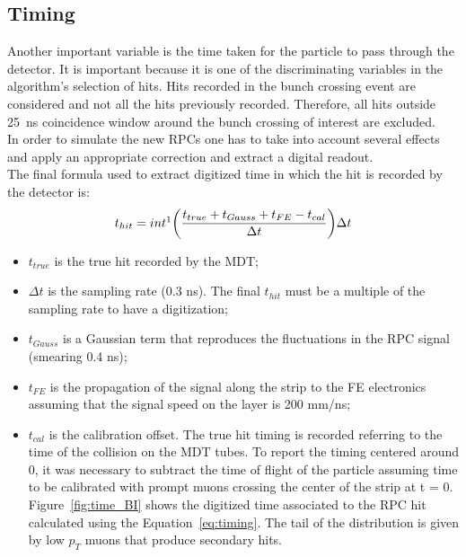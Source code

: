 \subsection{Timing}
\label{sec:timing}
Another important variable is the time taken for the particle to pass through the detector. It is 
important because it is one of the discriminating variables in the algorithm's selection of hits. 
Hits recorded in the bunch crossing event are considered and not all the hits previously recorded. 
Therefore, all hits outside 25~ns coincidence window around the bunch crossing of interest are 
excluded.\\
In order to simulate the new RPCs one has to take into account several effects and apply an 
appropriate correction and extract a digital readout.
\vspace{\baselineskip}\\
The final formula used to extract digitized time in which the hit is recorded by the detector is:
\begin{equation}
t_{hit}= int\footnotemark\bigg(\frac{t_{true}+t_{Gauss}+t_{FE}-t_{cal}}{\Delta t}\bigg)\Delta t
\label{eq:timing}
\end{equation}
\begin{itemize}
	\item $t_{true}$ is the true hit recorded by the MDT;
	\item $\Delta t$ is the sampling rate (0.3 ns). The final $t_{hit}$ must be a multiple of the sampling rate to have a digitization;
	\item $t_{Gauss}$ is a Gaussian term that reproduces the fluctuations in the RPC signal 
	(smearing 0.4 ns);
	\item $t_{FE}$ is the propagation of the signal along the strip to the FE electronics 
	assuming  that the signal speed on the layer is 200 mm/ns;
	\item $t_{cal}$ is the calibration offset. The true hit timing is recorded referring to the time 
	of the collision on the MDT tubes. To report the timing centered around 0, it was necessary to 
	subtract the time of flight of the particle assuming time to be calibrated with 
	prompt muons crossing the center of the strip at t = 0.
\vspace{\baselineskip}\\	
Figure~\ref{fig:time_BI} shows the digitized time associated to the RPC hit calculated using the 
Equation~\ref{eq:timing}. The tail of the distribution is given by low $p_T$ muons  that produce 
secondary hits.
\end{itemize} 

